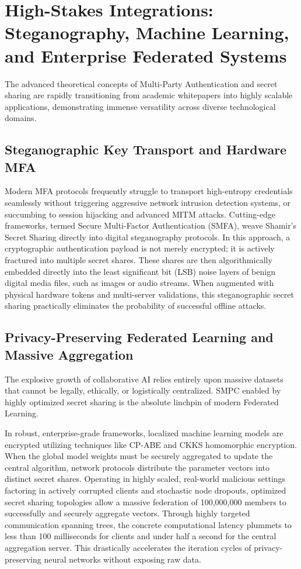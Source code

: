 \documentclass[11pt, a4paper]{article}
\begin{document}
\section*{High-Stakes Integrations: Steganography, Machine Learning, and Enterprise Federated Systems}
The advanced theoretical concepts of Multi-Party Authentication and secret sharing are rapidly transitioning from academic whitepapers into highly scalable applications, demonstrating immense versatility across diverse technological domains.

\subsection*{Steganographic Key Transport and Hardware MFA}
Modern MFA protocols frequently struggle to transport high-entropy credentials seamlessly without triggering aggressive network intrusion detection systems, or succumbing to session hijacking and advanced MITM attacks. Cutting-edge frameworks, termed Secure Multi-Factor Authentication (SMFA), weave Shamir’s Secret Sharing directly into digital steganography protocols. In this approach, a cryptographic authentication payload is not merely encrypted; it is actively fractured into multiple secret shares. These shares are then algorithmically embedded directly into the least significant bit (LSB) noise layers of benign digital media files, such as images or audio streams. When augmented with physical hardware tokens and multi-server validations, this steganographic secret sharing practically eliminates the probability of successful offline attacks.

\subsection*{Privacy-Preserving Federated Learning and Massive Aggregation}
The explosive growth of collaborative AI relies entirely upon massive datasets that cannot be legally, ethically, or logistically centralized. SMPC enabled by highly optimized secret sharing is the absolute linchpin of modern Federated Learning.

In robust, enterprise-grade frameworks, localized machine learning models are encrypted utilizing techniques like CP-ABE and CKKS homomorphic encryption. When the global model weights must be securely aggregated to update the central algorithm, network protocols distribute the parameter vectors into distinct secret shares. Operating in highly scaled, real-world malicious settings factoring in actively corrupted clients and stochastic node dropouts, optimized secret sharing topologies allow a massive federation of 100,000,000 members to successfully and securely aggregate vectors. Through highly targeted communication spanning trees, the concrete computational latency plummets to less than 100 milliseconds for clients and under half a second for the central aggregation server. This drastically accelerates the iteration cycles of privacy-preserving neural networks without exposing raw data.
\end{document}
